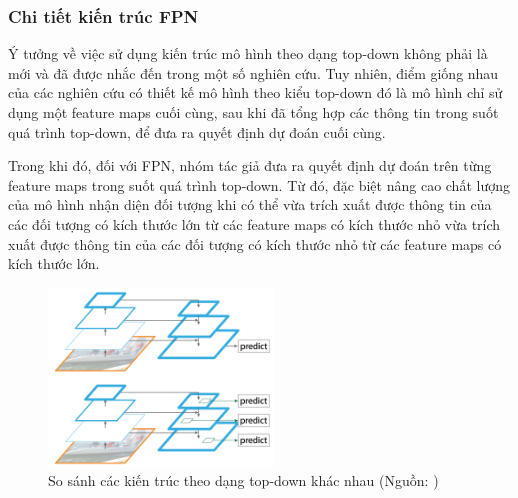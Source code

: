 {    \subsubsection{Chi tiết kiến trúc FPN}
    Ý tưởng về việc sử dụng kiến trúc mô hình theo dạng top-down không phải là mới và đã được nhắc đến trong một số nghiên cứu. Tuy nhiên, điểm giống nhau của các nghiên cứu có thiết kế mô hình theo kiểu top-down đó là mô hình chỉ sử dụng một feature maps  cuối cùng, sau khi đã tổng hợp các thông tin trong suốt quá trình top-down, để đưa ra quyết định dự đoán cuối cùng.

    \noindent
    Trong khi đó, đối với FPN, nhóm tác giả đưa ra quyết định dự đoán trên từng feature maps  trong suốt quá trình top-down. Từ đó, đặc biệt nâng cao chất lượng của mô hình nhận diện đối tượng  khi có thể vừa trích xuất được thông tin của các đối tượng có kích thước lớn từ các feature maps  có kích thước nhỏ vừa trích xuất được thông tin của các đối tượng có kích thước nhỏ từ các feature maps  có kích thước lớn.

    \begin{figure}[H]
        \centering
        \includegraphics[width=6cm] {images/fpn_topdown}
        \caption{So sánh các kiến trúc theo dạng top-down khác nhau (Nguồn: \cite{lin2017feature})}
        \label{fig:fpn_topdown}
    \end{figure}

}
